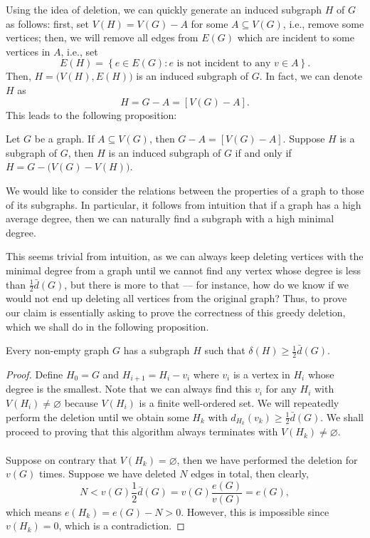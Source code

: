 \documentclass[math, code]{amznotes}
\theoremstyle{remark}
\begin{document}
Using the idea of deletion, we can quickly generate an induced subgraph $H$ of $G$ as follows: first, set $V(H) = V(G) - A$ for some $A \subseteq V(G)$, i.e., remove some vertices; then, we will remove all edges from $E(G)$ which are incident to some vertices in $A$, i.e., set
\begin{equation*}
    E(H) = \left\{e \in E(G) \colon e \textrm{ is not incident to any } v \in A\right\}.
\end{equation*}
Then, $H = \bigl(V(H), E(H)\bigr)$ is an induced subgraph of $G$. In fact, we can denote $H$ as
\begin{equation*}
    H = G - A = [V(G) - A].
\end{equation*}
This leads to the following proposition:
\begin{probox}{}{}
    Let $G$ be a graph. If $A \subseteq V(G)$, then $G - A = [V(G) - A]$. Suppose $H$ is a subgraph of $G$, then $H$ is an induced subgraph of $G$ if and only if $H = G - \bigl(V(G) - V(H)\bigr)$.
\end{probox}
We would like to consider the relations between the properties of a graph to those of its subgraphs. In particular, it follows from intuition that if a graph has a high average degree, then we can naturally find a subgraph with a high minimal degree.

This seems trivial from intuition, as we can always keep deleting vertices with the minimal degree from a graph until we cannot find any vertex whose degree is less than $\frac{1}{2}\bar{d}(G)$, but there is more to that --- for instance, how do we know if we would not end up deleting all vertices from the original graph? Thus, to prove our claim is essentially asking to prove the correctness of this greedy deletion, which we shall do in the following proposition.
\begin{probox}{}{}
    Every non-empty graph $G$ has a subgraph $H$ such that $\delta(H) \geq \frac{1}{2} \bar{d}(G)$.
    \tcblower
    \begin{proof}
        Define $H_0 = G$ and $H_{i + 1} = H_i - v_i$ where $v_i$ is a vertex in $H_i$ whose degree is the smallest. Note that we can always find this $v_i$ for any $H_i$ with $V(H_i) \neq \varnothing$ because $V(H_i)$ is a finite well-ordered set. We will repeatedly perform the deletion until we obtain some $H_k$ with $d_{H_k}(v_k) \geq \frac{1}{2}\bar{d}(G)$. We shall proceed to proving that this algorithm always terminates with $V(H_k) \neq \varnothing$.
        \\\\
        Suppose on contrary that $V(H_k) = \varnothing$, then we have performed the deletion for $v(G)$ times. Suppose we have deleted $N$ edges in total, then clearly,
        \begin{equation*}
            N < v(G)\frac{1}{2}\bar{d}(G) = v(G)\frac{e(G)}{v(G)} = e(G),
        \end{equation*}
        which means $e(H_k) = e(G) - N > 0$. However, this is impossible since $v(H_k) = 0$, which is a contradiction.
    \end{proof}
\end{probox}
\end{document}
